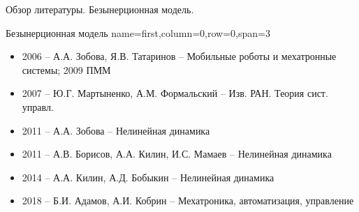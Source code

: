 \begin{myposter}{
    Обзор литературы. Безынерционная модель.
}

    \headerbox
    {Безынерционная модель}
    {name=first,column=0,row=0,span=3}
    {
        {\huge\bf
            \begin{itemize}
                \item 2006 -- А.А. Зобова, Я.В. Татаринов -- Мобильные роботы и мехатронные системы; 2009 ПММ
                \item 2007 -- Ю.Г. Мартыненко, А.М. Формальский -- Изв. РАН. Теория сист. управл.
                \item 2011 -- А.А. Зобова -- Нелинейная динамика
                \item 2011 -- А.В. Борисов, А.А. Килин, И.С. Мамаев -- Нелинейная динамика
                \item 2014 -- А.А. Килин, А.Д. Бобыкин -- Нелинейная динамика
                \item 2018 -- Б.И. Адамов, А.И. Кобрин -- Мехатроника, автоматизация, управление
            \end{itemize}
        }
    }
    

\end{myposter}
